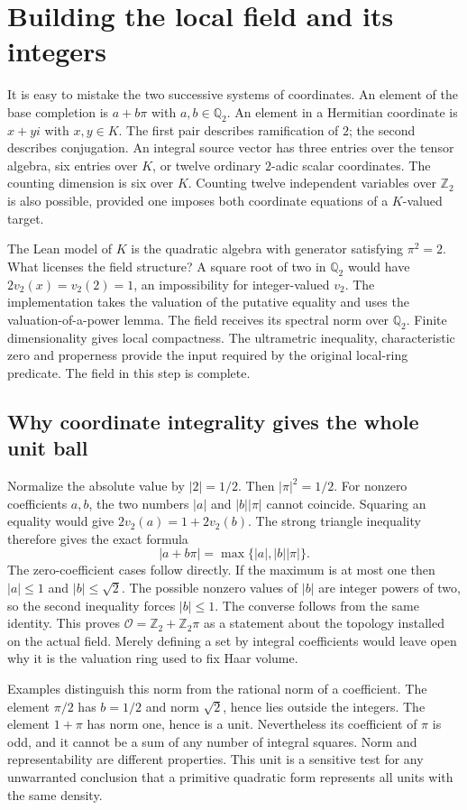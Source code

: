 \documentclass[12pt,letterpaper]{article}
\begin{document}
\section{Building the local field and its integers}
It is easy to mistake the two successive systems of coordinates. An element of the base completion is $a+b\pi$ with $a,b\in\mathbb Q_2$. An element in a Hermitian coordinate is $x+yi$ with $x,y\in K$. The first pair describes ramification of $2$; the second describes conjugation. An integral source vector has three entries over the tensor algebra, six entries over $K$, or twelve ordinary $2$-adic scalar coordinates. The counting dimension is six over $K$. Counting twelve independent variables over $\mathbb Z_2$ is also possible, provided one imposes both coordinate equations of a $K$-valued target.
\par
The Lean model of $K$ is the quadratic algebra with generator satisfying $\pi^2=2$. What licenses the field structure? A square root of two in $\mathbb Q_2$ would have $2v_2(x)=v_2(2)=1$, an impossibility for integer-valued $v_2$. The implementation takes the valuation of the putative equality and uses the valuation-of-a-power lemma. The field receives its spectral norm over $\mathbb Q_2$. Finite dimensionality gives local compactness. The ultrametric inequality, characteristic zero and properness provide the input required by the original local-ring predicate. The field in this step is complete.
\subsection{Why coordinate integrality gives the whole unit ball}
Normalize the absolute value by $|2|=1/2$. Then $|\pi|^2=1/2$. For nonzero coefficients $a,b$, the two numbers $|a|$ and $|b||\pi|$ cannot coincide. Squaring an equality would give $2v_2(a)=1+2v_2(b)$. The strong triangle inequality therefore gives the exact formula
\[
       |a+b\pi|=\max\{|a|,|b||\pi|\}.
\]
The zero-coefficient cases follow directly. If the maximum is at most one then $|a|\leq1$ and $|b|\leq\sqrt2$. The possible nonzero values of $|b|$ are integer powers of two, so the second inequality forces $|b|\leq1$. The converse follows from the same identity. This proves $\mathcal O=\mathbb Z_2+\mathbb Z_2\pi$ as a statement about the topology installed on the actual field. Merely defining a set by integral coefficients would leave open why it is the valuation ring used to fix Haar volume.
\par
Examples distinguish this norm from the rational norm of a coefficient. The element $\pi/2$ has $b=1/2$ and norm $\sqrt2$, hence lies outside the integers. The element $1+\pi$ has norm one, hence is a unit. Nevertheless its coefficient of $\pi$ is odd, and it cannot be a sum of any number of integral squares. Norm and representability are different properties. This unit is a sensitive test for any unwarranted conclusion that a primitive quadratic form represents all units with the same density.
\end{document}
